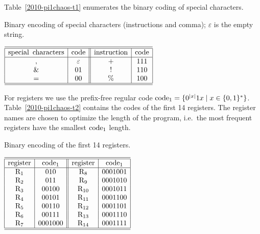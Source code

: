 \documentclass[
aip,
cha,
amssymb
]{revtex4-1}
\begin{document}
Table~\ref{2010-pi1chaos-t1} enumerates the binary coding of  special characters.
\begin{table}
\caption{Binary encoding of  special characters (instructions and comma); $\varepsilon$ is the empty string.}
\begin{center}
$\begin{array}{|c|c||c|c|}
\hline\hline
{\rm special   } \,\,\, {\rm  characters} & {\rm code} &  {\rm instruction} & {\rm code}\\  \hline
, & \varepsilon  & + & 111 \\
 \& & 01 & ! &  110 \\
= & 00  & \% & 100\\
 \hline\hline \end{array}
$
\end{center}
\label{2010-pi1chaos-t1}
\end{table}
For registers we use the prefix-free regular code ${\rm code}_{1} = \{0^{|x|}1x \mid x\in\{0,1\}^{*}\}$.
Table~\ref{2010-pi1chaos-t2} contains the codes of
the first 14 registers. The register names are chosen  to  optimize the length of the program, i.e.\
the most frequent registers have the smallest ${\rm code}_{1}$ length.
\begin{table}
\caption{Binary encoding of the first 14 registers.}
\begin{center}
$\begin{array}{|c|c||c|c|}
\hline\hline
{\rm register} & {\rm code}_{1} & {\rm register} & {\rm code}_{1} \\\hline
{\rm R}_1 & 010 & {\rm R}_8  & 0001001\\
{\rm R}_2 & 011 & {\rm R}_9 & 0001010\\
{\rm R}_3 & 00100 & {\rm R}_{10} & 0001011\\
{\rm R}_4 & 00101 & {\rm R}_{11}  & 0001100\\
{\rm R}_5 & 00110 & {\rm R}_{12} & 0001101\\
{\rm R}_6  & 00111 & {\rm R}_{13} & 0001110\\
{\rm R}_7  & 0001000 & {\rm R}_{14} & 0001111\\
\hline\hline
\end{array}$
\end{center}
\label{2010-pi1chaos-t2}
\end{table}
\end{document}
